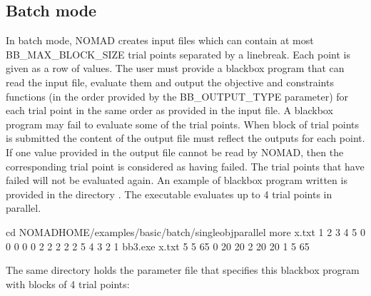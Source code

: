 \documentclass[letterpaper,10pt,english]{sphinxmanual}
\begin{document}
\subsection{Batch mode}
\label{\detokenize{AdvancedFunctionalities:batch-mode}}
\sphinxAtStartPar
In batch mode, NOMAD creates input files which can contain at most
BB\_MAX\_BLOCK\_SIZE trial points separated by a linebreak. Each point is given as a row of values.
The user must provide a blackbox program that can read the input file, evaluate them and
output the objective and constraints functions (in the order provided by the BB\_OUTPUT\_TYPE
parameter) for each trial point in the same order as provided in the input file.
A blackbox program may fail to evaluate some of the trial points. When block of trial points is
submitted the content of the output file must reflect the outputs for each point.
If one value provided in the output file
cannot be read by NOMAD, then the corresponding trial point is considered as having failed.
The trial points that have failed will not be evaluated again.
An example of blackbox program written is provided in the
directory .
The executable  evaluates up to 4 trial points in parallel.

\begin{sphinxVerbatim}[commandchars=\\\{\}]
\PYGZgt{} cd \PYGZdl{}NOMAD\PYGZus{}HOME/examples/basic/batch/single\PYGZus{}obj\PYGZus{}parallel
\PYGZgt{} more x.txt
1 2 3 4 5
0 0 0 0 0
2 2 2 2 2
5 4 3 2 1
\PYGZgt{} bb3.exe x.txt
5 5 \PYGZhy{}65
0 \PYGZhy{}20 20
2 \PYGZhy{}20 \PYGZhy{}20
1 5 \PYGZhy{}65
\end{sphinxVerbatim}

\sphinxAtStartPar
The same directory holds the parameter file that specifies this blackbox program with blocks of 4 trial points:
\end{document}
